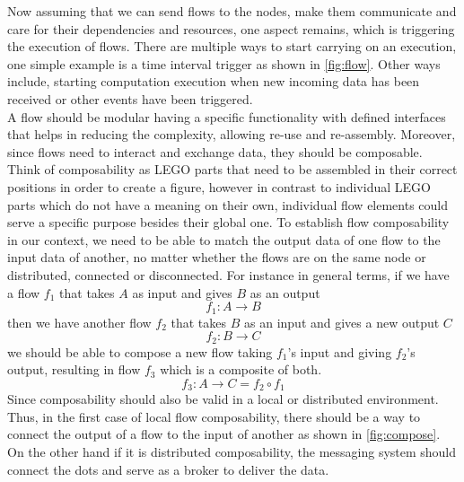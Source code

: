 Now assuming that we can send flows to the nodes, make them communicate and care for their dependencies and resources, one aspect remains, which is triggering the execution of flows. There are multiple ways to start carrying on an execution, one simple example is a time interval trigger as shown in \ref{fig:flow}. Other ways include, starting computation execution when new incoming data has been received or other events have been triggered.\\




 A flow should be modular having a specific functionality with defined interfaces that helps in reducing the complexity, allowing re-use and re-assembly. Moreover, since flows need to interact and exchange data, they should be composable. Think of composability as LEGO parts that need to be assembled in their correct positions in order to create a figure, however in contrast to individual LEGO parts which do not have a meaning on their own, individual flow elements could serve a specific purpose besides their global one. To establish flow composability in our context, we need to be able to match the output data of one flow to the input data of another, no matter whether the flows are on the same node or distributed, connected or disconnected. For instance in general terms, if we have a flow \(f_1\) that takes \(A\) as input and gives \(B\) as an output
\[ f_1 : A  \to B  \]
then we have another flow \(f_2\) that takes \(B\) as an input and gives a new output \(C\)
\[ f_2 : B  \to C  \]
we should be able to compose a new flow taking \(f_1\)'s input and giving \(f_2\)'s output, resulting in flow \(f_3\) which is a composite of both.
\[f_3: A \to C = f_2 \circ f_1\]
Since composability should also be valid in a local or distributed environment. Thus, in the first case of local flow composability, there should be a way to connect the output of a flow to the input of another as shown in \ref{fig:compose}. On the other hand if it is distributed composability, the messaging system should connect the dots and serve as a broker to deliver the data.

